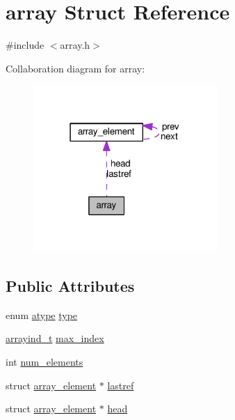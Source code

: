 \hypertarget{structarray}{}\section{array Struct Reference}
\label{structarray}


{\ttfamily \#include $<$array.\+h$>$}



Collaboration diagram for array\+:
\nopagebreak
\begin{figure}[H]
\begin{center}
\leavevmode
\includegraphics[width=198pt]{structarray__coll__graph}
\end{center}
\end{figure}
\subsection*{Public Attributes}
\begin{DoxyCompactItemize}
\item 
enum \hyperlink{array_8h_abdcaecc1476c2ef209cae471c64c6666}{atype} \hyperlink{structarray_a0af29fc53de2cf89bf3945427930dc0f}{type}
\item 
\hyperlink{array_8h_a3672e3c5b95dde98c9ed75ac7c1e6d60}{arrayind\+\_\+t} \hyperlink{structarray_a943ecba4fe38c813000d0887e7859418}{max\+\_\+index}
\item 
int \hyperlink{structarray_a229c94ec6c46937062a5fd69e488042d}{num\+\_\+elements}
\item 
struct \hyperlink{structarray__element}{array\+\_\+element} $\ast$ \hyperlink{structarray_a1dce002b80f5a241fd5e5efd9ad82494}{lastref}
\item 
struct \hyperlink{structarray__element}{array\+\_\+element} $\ast$ \hyperlink{structarray_ac9efd0fe7a5541bd146bd5481dd851cc}{head}
\end{DoxyCompactItemize}


